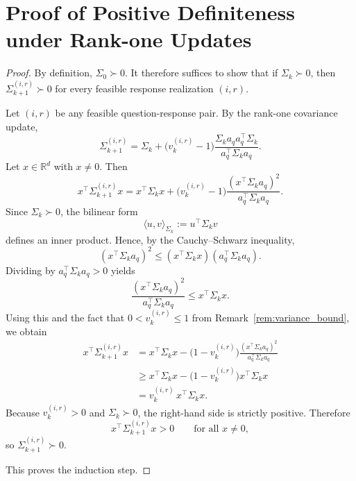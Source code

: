 \documentclass{article}
\begin{document}
\section{Proof of Positive Definiteness under Rank-one Updates} \label{appendix:posdef}
\begin{proof}
By definition, $\Sigma_0\succ 0$. It therefore suffices to show that if $\Sigma_k\succ 0$,
then $\Sigma_{k+1}^{(i,r)}\succ 0$ for every feasible response realization $(i,r)$.

Let $(i,r)$ be any feasible question-response pair.
By the rank-one covariance update,
\begin{equation*}
\Sigma_{k+1}^{(i,r)}
=
\Sigma_k
+
\bigl(v_k^{(i,r)}-1\bigr)
\frac{\Sigma_k a_q a_q^\top \Sigma_k}{a_q^\top \Sigma_k a_q}.
\end{equation*}
Let $x\in\mathbb R^d$ with $x\neq 0$. Then
\begin{equation*}
x^\top \Sigma_{k+1}^{(i,r)} x
=
x^\top \Sigma_k x
+
\bigl(v_k^{(i,r)}-1\bigr)
\frac{(x^\top \Sigma_k a_q)^2}{a_q^\top \Sigma_k a_q}.
\end{equation*}
Since $\Sigma_k\succ 0$, the bilinear form
\begin{equation*}
\langle u,v\rangle_{\Sigma_k}:=u^\top \Sigma_k v
\end{equation*}
defines an inner product. Hence, by the Cauchy--Schwarz inequality,
\begin{equation*}
(x^\top \Sigma_k a_q)^2
\le
(x^\top \Sigma_k x)(a_q^\top \Sigma_k a_q).
\end{equation*}
Dividing by $a_q^\top \Sigma_k a_q>0$ yields
\begin{equation*}
\frac{(x^\top \Sigma_k a_q)^2}{a_q^\top \Sigma_k a_q}
\le
x^\top \Sigma_k x.
\end{equation*}
Using this and the fact that $0<v_k^{(i,r)}\le 1$ from
Remark~\ref{rem:variance_bound}, we obtain
\begin{align*}
x^\top \Sigma_{k+1}^{(i,r)} x
&=
x^\top \Sigma_k x
-
\bigl(1-v_k^{(i,r)}\bigr)
\frac{(x^\top \Sigma_k a_q)^2}{a_q^\top \Sigma_k a_q} \\
&\ge
x^\top \Sigma_k x
-
\bigl(1-v_k^{(i,r)}\bigr)x^\top \Sigma_k x \\
&=
v_k^{(i,r)}\,x^\top \Sigma_k x.
\end{align*}
Because $v_k^{(i,r)}>0$ and $\Sigma_k\succ 0$, the right-hand side is strictly positive.
Therefore
\begin{equation*}
x^\top \Sigma_{k+1}^{(i,r)} x>0
\qquad\text{for all }x\neq 0,
\end{equation*}
so $\Sigma_{k+1}^{(i,r)}\succ 0$.

This proves the induction step. 
\end{proof}
\end{document}
